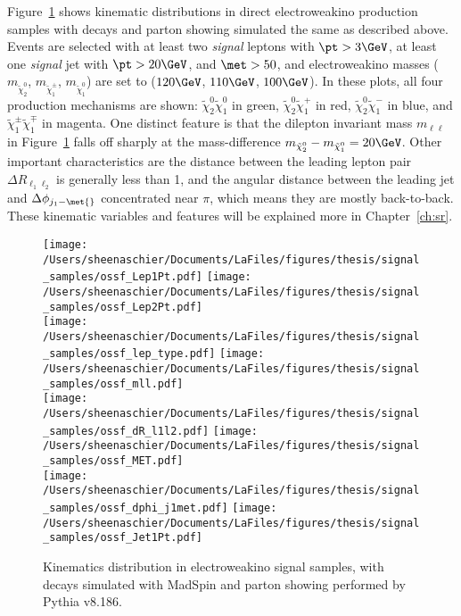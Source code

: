 Figure~\ref{fig:SigSample1} shows kinematic distributions in direct electroweakino production samples with decays and parton showing simulated the same as described above.  Events are selected with at least two \textit{signal} leptons with $\pt>3\GeV$, at least one \textit{signal} jet with $\pt>20\GeV$, and $\met>50$, and electroweakino masses ($m_{\tilde\chi_2^0}$, $m_{\tilde\chi_1^\pm}$, $m_{\tilde\chi_1^0}$) are set to ($120\GeV$, $110\GeV$, $100\GeV$).  In these plots, all four production mechanisms are shown: $\tilde\chi_2^0\tilde\chi_1^0$ in green, $\tilde\chi_2^0\tilde\chi_1^+$ in red, $\tilde\chi_2^0\tilde\chi_1^-$ in blue, and $\tilde\chi_1^\pm\tilde\chi_1^\mp$ in magenta.  One distinct feature is that the dilepton invariant mass $m_{\ell\ell}$ in Figure~\ref{fig:SigSample1} falls off sharply at the mass-difference $m_{\tilde\chi_2^0}-m_{\tilde\chi_1^0} = 20\GeV$.  Other important characteristics are the distance between the leading lepton pair $\Delta R_{\ell_1\ell_2}$ is generally less than 1, and the angular distance between the leading jet and \met $\Delta\phi_{j_1-\met{}}$ concentrated near $\pi$, which means they are mostly back-to-back.  These kinematic variables and features will be explained more in Chapter~\ref{ch:sr}. 

  \begin{figure}[tbp]
 \texttt{[image: /Users/sheenaschier/Documents/LaFiles/figures/thesis/signal\_samples/ossf\_Lep1Pt.pdf]}
 \texttt{[image: /Users/sheenaschier/Documents/LaFiles/figures/thesis/signal\_samples/ossf\_Lep2Pt.pdf]}\\
 \texttt{[image: /Users/sheenaschier/Documents/LaFiles/figures/thesis/signal\_samples/ossf\_lep\_type.pdf]}
  \texttt{[image: /Users/sheenaschier/Documents/LaFiles/figures/thesis/signal\_samples/ossf\_mll.pdf]}\\
  \texttt{[image: /Users/sheenaschier/Documents/LaFiles/figures/thesis/signal\_samples/ossf\_dR\_l1l2.pdf]}
    \texttt{[image: /Users/sheenaschier/Documents/LaFiles/figures/thesis/signal\_samples/ossf\_MET.pdf]}\\
      \texttt{[image: /Users/sheenaschier/Documents/LaFiles/figures/thesis/signal\_samples/ossf\_dphi\_j1met.pdf]}
       \texttt{[image: /Users/sheenaschier/Documents/LaFiles/figures/thesis/signal\_samples/ossf\_Jet1Pt.pdf]}
 \caption{Kinematics distribution in electroweakino signal samples, with decays simulated with MadSpin and parton showing performed by Pythia v8.186.}
   \label{fig:SigSample1}
 \end{figure}
 
